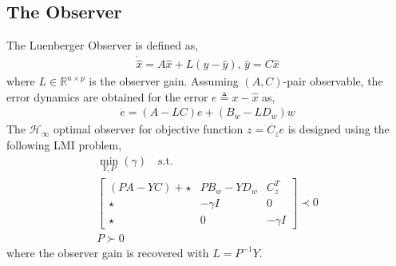 \subsection{The Observer}
The Luenberger Observer is defined as,    
\begin{gather} 
    \dot{\hat{x}}=A \hat{x}+L(y-\hat{y}),\,\hat{y}=C \hat{x}
\end{gather}
where $L\in\mathbb{R}^{n\times p}$ is the observer gain. Assuming $(A,C)$-pair observable, the error dynamics are obtained for the error $e\triangleq x-\hat{x}$ as,
\begin{gather} 
    \dot{e}=(A-LC)e+(B_w-L D_w)w
\end{gather}
The $\mathcal{H}_\infty$ optimal observer for objective function $z=C_ze$ is designed using the following LMI problem\cite{duan2013lmis},
\begin{equation*} \label{eq:p_lmi1}
\begin{split} 
    \min_{Y,P}{(\gamma)}\quad \mathrm{s.t.}\\
    \begin{bmatrix}
        (PA-YC)+\star& PB_w-YD_w& C_z^T\\
        \star& -\gamma I& 0\\
        \star& 0& -\gamma I
    \end{bmatrix}\prec 0\\
    P\succ 0
\end{split} 
\end{equation*}
where the observer gain is recovered with $L=P^{-1}Y$. 


